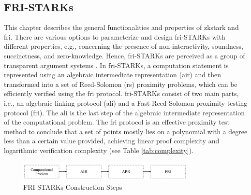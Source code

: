 \subsection{FRI-STARKs}
This chapter describes the general functionalities and properties of \acrshort{zkstark} and \acrshort{fri}. There are various options to parameterize and design \acrshort{fri}-STARKs with different properties, e.g., concerning the presence of non-interactivity, soundness, succinctness, and zero-knowledge. Hence, \acrshort{fri}-STARKs are perceived as a group of transparent argument systems \citep{zkstark}. In \acrshort{fri}-STARKs, a computation statement is represented using an algebraic intermediate representation (\acrshort{air}) and then transformed into a set of Reed-Solomon (\acrshort{rs}) proximity problems, which can be efficiently verified using the \acrshort{fri} protocol. \acrshort{fri}-STARKs consist of two main parts, i.e., an algebraic linking protocol (\acrshort{ali}) and a Fast Reed-Solomon proximity testing protocol (\acrshort{fri}). The \acrshort{ali} is the last step of the algebraic intermediate representation of the computational problem. The \acrshort{fri} protocol is an effective proximity test method to conclude that a set of points mostly lies on a polynomial with a degree less than a certain value provided, achieving linear proof complexity and logarithmic verification complexity (see Table \ref{tab:complexity}). 
\begin{figure}[hbt]
	\centering
	\includegraphics[width=0.8\textwidth]{Pictures/zkstark.png}
	\caption{FRI-STARKs Construction Steps}
	\label{fig:fristark}
\end{figure}

